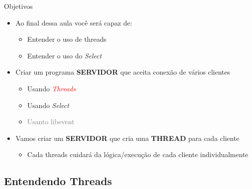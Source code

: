 \documentclass[10pt, xcolor=x11names]{beamer}
\begin{document}
\begin{frame}
	\begin{block}{Objetivos}
		\begin{itemize}
			\item Ao final dessa aula você será capaz de:
			\begin{itemize}
				\item Entender o uso de threads
				\item Entender o uso do \textit{Select}
			\end{itemize}
			\item Criar um programa \textbf{SERVIDOR} que aceita conexão de vários clientes
			\begin{itemize}
				\item Usando \textcolor<2->{red}{\textit{Threads}}
				\item Usando \textit{Select}
				\item \textcolor{gray}{Usanto libevent}
			\end{itemize}
		\end{itemize}
		\begin{itemize}
			\item<2-> Vamos criar um \textbf{SERVIDOR} que cria uma \textbf{THREAD} para cada cliente
			\begin{itemize}
				\item Cada threads cuidará da lógica/execução de cada cliente individualmente
			\end{itemize}
		\end{itemize}
	\end{block}
\end{frame}

\subsection{Entendendo Threads} %
\end{document}
